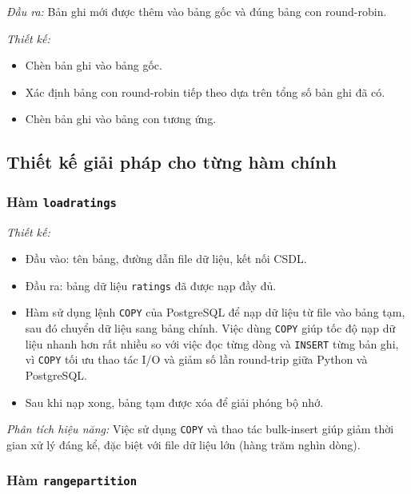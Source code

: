 \documentclass[14pt]{extarticle}
\begin{document}
\textit{Đầu ra:}  
Bản ghi mới được thêm vào bảng gốc và đúng bảng con round-robin.

\textit{Thiết kế:}
\begin{itemize}
    \item Chèn bản ghi vào bảng gốc.
    \item Xác định bảng con round-robin tiếp theo dựa trên tổng số bản ghi đã có.
    \item Chèn bản ghi vào bảng con tương ứng.
\end{itemize}

\subsection{Thiết kế giải pháp cho từng hàm chính}

\subsubsection{Hàm \texttt{loadratings}}

\textit{Thiết kế:}
\begin{itemize}
    \item Đầu vào: tên bảng, đường dẫn file dữ liệu, kết nối CSDL.
    \item Đầu ra: bảng dữ liệu \texttt{ratings} đã được nạp đầy đủ.
    \item Hàm sử dụng lệnh \texttt{COPY} của PostgreSQL để nạp dữ liệu từ file vào bảng tạm, sau đó chuyển dữ liệu sang bảng chính. Việc dùng \texttt{COPY} giúp tốc độ nạp dữ liệu nhanh hơn rất nhiều so với việc đọc từng dòng và \texttt{INSERT} từng bản ghi, vì \texttt{COPY} tối ưu thao tác I/O và giảm số lần round-trip giữa Python và PostgreSQL.
    \item Sau khi nạp xong, bảng tạm được xóa để giải phóng bộ nhớ.
\end{itemize}
\textit{Phân tích hiệu năng:}  
Việc sử dụng \texttt{COPY} và thao tác bulk-insert giúp giảm thời gian xử lý đáng kể, đặc biệt với file dữ liệu lớn (hàng trăm nghìn dòng).

\subsubsection{Hàm \texttt{rangepartition}}
\end{document}
